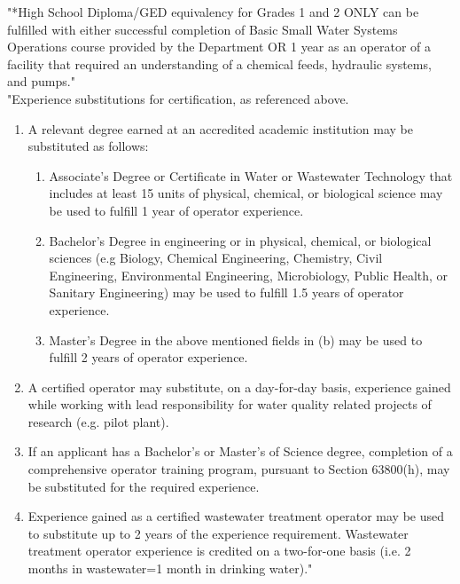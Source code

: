 \begin{tiny}
"*High School Diploma/GED equivalency for Grades 1 and 2 ONLY can be fulfilled with either successful completion of Basic Small Water Systems Operations course provided by the Department
OR 1 year as an operator of a facility that required an understanding of a chemical feeds, hydraulic systems, and pumps."\\			
"Experience substitutions for certification, as referenced above.
\begin{enumerate}
\item A relevant degree earned at an accredited academic institution may be substituted as follows:
\begin{enumerate}[label=\alph*)]
\item Associate’s Degree or Certificate in Water or Wastewater Technology that includes at least 15 units of physical, chemical, or biological science may be used to fulfill 1 year of operator experience.
\item Bachelor’s Degree in engineering or in physical, chemical, or biological sciences (e.g Biology, Chemical Engineering, Chemistry, Civil Engineering, Environmental Engineering, Microbiology, Public Health, or Sanitary Engineering) may be used to fulfill 1.5 years of operator experience.
\item Master’s Degree in the above mentioned fields in (b) may be used to fulfill 2 years of operator experience.
\end{enumerate}
\item A certified operator may substitute, on a day-for-day basis, experience gained while working with lead responsibility for water quality related projects of research (e.g. pilot plant).
\item If an applicant has a Bachelor’s or Master’s of Science degree, completion of a comprehensive operator training program, pursuant to Section 63800(h), may be substituted for the required experience.
\item Experience gained as a certified wastewater treatment operator may be used to substitute up to 2 years of the experience requirement. Wastewater treatment operator experience is credited on a two-for-one basis (i.e. 2 months in wastewater=1 month in drinking water)."			
\end{enumerate}
\end{tiny}
\newpage
\pagestyle{empty}

